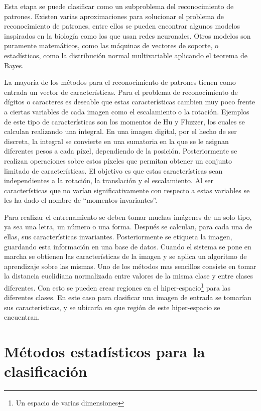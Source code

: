 \documentclass[a4paper, 11pt, oneside]{report}
\begin{document}
Esta etapa se puede clasificar como un subproblema del reconocimiento de patrones. Existen varias aproximaciones para solucionar el problema de reconocimiento de patrones, entre ellos se pueden encontrar algunos modelos inspirados en la biología como los que usan redes neuronales. Otros modelos son puramente matemáticos, como las máquinas de vectores de soporte, o estadísticos, como la distribución normal multivariable aplicando el teorema de Bayes.

La  mayoría de los métodos para el reconocimiento de patrones tienen como entrada un vector de características. Para el problema de reconocimiento de dígitos o caracteres es deseable que estas características cambien muy poco frente a ciertas variables de cada imagen como el escalamiento o la rotación. Ejemplos de este tipo de características son los momentos de Hu y Fluzzer, los cuales se calculan realizando una integral. En una imagen digital, por el hecho de ser discreta, la integral se convierte en una sumatoria en la que se le asignan diferentes pesos a cada píxel, dependiendo de la posición. Posteriormente se realizan operaciones sobre estos píxeles que permitan obtener un conjunto limitado de características. El objetivo es que estas características sean independientes a la rotación, la translación y el escalamiento. Al ser características que no varían significativamente con respecto a estas variables se les ha dado el nombre de ``momentos invariantes''.

Para realizar el entrenamiento se deben tomar muchas imágenes de un solo tipo, ya sea una letra, un número o una forma. Después se calculan, para cada una de ellas, sus características invariantes. Posteriormente se etiqueta la imagen, guardando esta información en una base de datos. Cuando el sistema se pone en marcha se obtienen las características de la imagen y se aplica un algoritmo de aprendizaje sobre las mismas. Uno de los métodos mas sencillos consiste en tomar la distancia euclidiana normalizada entre valores de la misma clase y entre clases diferentes. Con esto se pueden crear regiones en el hiper-espacio\footnote{Un espacio de varias dimensiones} para las diferentes clases. En este caso para clasificar una imagen de entrada se tomarían sus características, y se ubicaría en que región de este hiper-espacio se encuentran.
    
\chapter{Métodos estadísticos para la clasificación}
\label{chap:ml}
\end{document}
